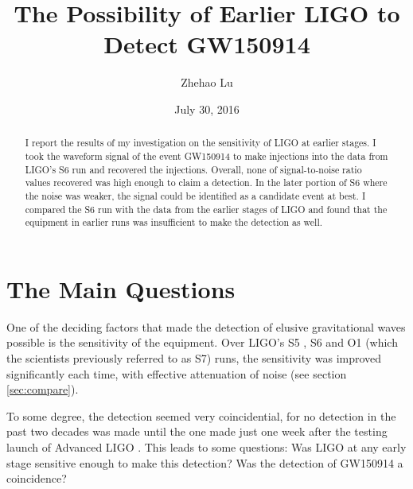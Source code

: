 \documentclass[aps,prd,preprint]{revtex4}
\begin{document}
\pagestyle{pioneer}
\date{July 30, 2016}
\preprint{}
\title{The Possibility of Earlier LIGO to Detect GW150914}
\author{Zhehao Lu}

\begin{abstract}
I report the results of my investigation on the sensitivity of LIGO at earlier stages. I took the waveform signal of the event GW150914 to make injections into the data from LIGO's S6 run and recovered the injections. Overall, none of signal-to-noise ratio values recovered was high enough to claim a detection. In the later portion of S6 where the noise was weaker, the signal could be identified as a candidate event at best. I compared the S6 run with the data from the earlier stages of LIGO and found that the equipment in earlier runs was insufficient to make the detection as well.
\end{abstract}
\maketitle



\section{The Main Questions}
One of the deciding factors that made the detection of elusive gravitational waves possible is the sensitivity of the equipment. Over LIGO's S5 \cite{S5}, S6 \cite{S6} and O1 \cite{Observation1} (which the scientists previously referred to as S7) runs, the sensitivity was improved significantly each time, with effective attenuation of noise (see section \ref{sec:compare}).
\par To some degree, the detection seemed very coincidential, for no detection in the past two decades was made until the one made just one week after the testing launch of Advanced LIGO \cite{timeline}. This leads to some questions: Was LIGO at any early stage sensitive enough to make this detection? Was the detection of GW150914 a coincidence?
\end{document}
